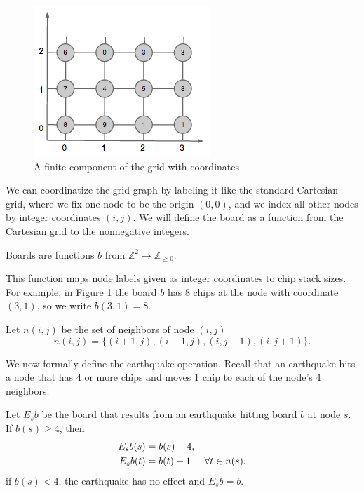 \documentclass[runningheads,a4paper]{llncs}
\begin{document}
\begin{figure}
\label{cartesiangrid}
\begin{center}
\includegraphics[scale=0.8]{cartesiangrid.png}
\end{center}
\caption{A finite component of the grid with coordinates}
\end{figure}

We can coordinatize the grid graph by labeling it like the standard Cartesian grid, where we fix one node to be the origin $(0,0)$, and we index all other nodes by integer coordinates $(i,j)$. We will define the board as a function from the Cartesian grid to the nonnegative integers.

\begin{definition} Boards are functions $b$ from $\mathbb{Z}^2 \to \mathbb{Z}_{\geq 0}$.
\end{definition}

This function maps node labels given as integer coordinates to chip stack sizes. For example, in Figure \ref{cartesiangrid} the board $b$ has 8 chips at the node with coordinate $(3,1)$, so we write $b(3,1) = 8$.

\begin{definition} Let $n(i,j)$ be the set of neighbors of node $(i,j)$
\begin{equation*}
n(i,j) = \{ (i+1, j), (i-1, j), (i, j-1), (i, j+1) \}.
\end{equation*}
\end{definition}

We now formally define the earthquake operation. Recall that an earthquake hits a node that has 4 or more chips and moves 1 chip to each of the node's 4 neighbors. 

\begin{definition}
Let $E_sb$ be the board that results from an earthquake hitting board $b$ at node $s$. If $b(s) \geq 4$, then
\begin{align*}
E_sb(s) &= b(s)-4,\\
E_sb(t) &= b(t)+1 \hspace{.5cm} \forall t \in n(s).\\
\end{align*}
if $b(s) < 4$, the earthquake has no effect and $E_sb = b$. 
\end{definition}
\end{document}
